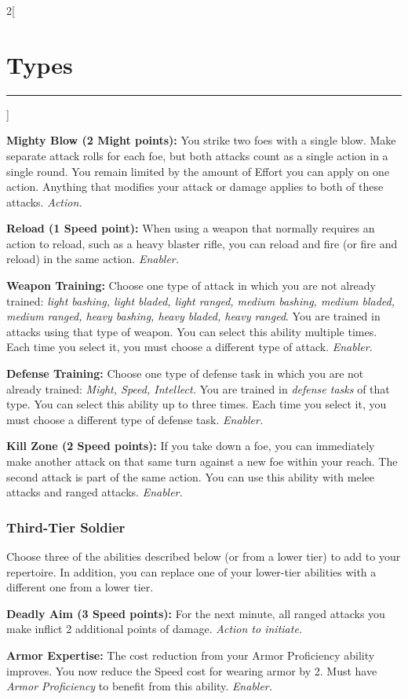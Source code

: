 \documentclass[a4paper,10pt,final]{book}
\newcommand{\HRule}{\rule{\linewidth}{0.5mm}} %
\newcommand{\newSection}[1]{\section*{#1} \addcontentsline{toc}{section}{#1} \label{sec:#1} \HRule}
\newcommand{\itemAbility}[2]{\textcolor{25gray}{\textbullet\textbf{ #1:}} {#2}\par}
\newcommand{\enabler}{\textit{ Enabler.}}
\newcommand{\action}{\textit{ Action.}}
\newcommand{\actionInit}{\textit{ Action to initiate.}}
\newenvironment{docsection}[1]
{
  \begin{multicols*}{2}[\newSection{#1}]
}
{
  \end{multicols*}
  \newpage
}
\begin{document}
\begin{docsection}{Types}
\itemAbility{Mighty Blow (2 Might points)}{You strike two foes with a single blow. Make separate attack rolls for each foe, but both attacks count as a single action in a single round. You remain limited by the amount of Effort you can apply on one action. Anything that modifies your attack or damage applies to both of these attacks.\action}

\itemAbility{Reload (1 Speed point)}{When using a weapon that normally requires an action to reload, such as a heavy blaster rifle, you can reload and fire (or fire and reload) in the same action.\enabler}

\itemAbility{Weapon Training}{Choose one type of attack in which you are not already trained: \textit{light bashing, light bladed, light ranged, medium bashing, medium bladed, medium ranged, heavy bashing, heavy bladed, heavy ranged}. You are trained in attacks using that type of weapon. You can select this ability multiple times. Each time you select it, you must choose a different type of attack.\enabler}

\itemAbility{Defense Training}{Choose one type of defense task in which you are not already trained: \textit{Might, Speed, Intellect.} You are trained in \emph{defense tasks} of that type. You can select this ability up to three times. Each time you select it, you must choose a different type of defense task.\enabler}

\itemAbility{Kill Zone (2 Speed points)}{If you take down a foe, you can immediately make another attack on that same turn against a new foe within your reach. The second attack is part of the same action. You can use this ability with melee attacks and ranged attacks.\enabler}


\subsubsection*{Third-Tier Soldier}
\label{subsub:soldierThirdTier}

Choose three of the abilities described below (or from a lower tier) to add to your repertoire. In addition, you can replace one of your lower-tier abilities with a different one from a lower tier.

\itemAbility{Deadly Aim (3 Speed points)}{For the next minute, all ranged attacks you make inflict 2 additional points of damage.\actionInit}

\itemAbility{Armor Expertise}{The cost reduction from your Armor Proficiency ability improves. You now reduce the Speed cost for wearing armor by 2. Must have \textit{Armor Proficiency} to benefit from this ability.\enabler}


\end{docsection}
\end{document}
